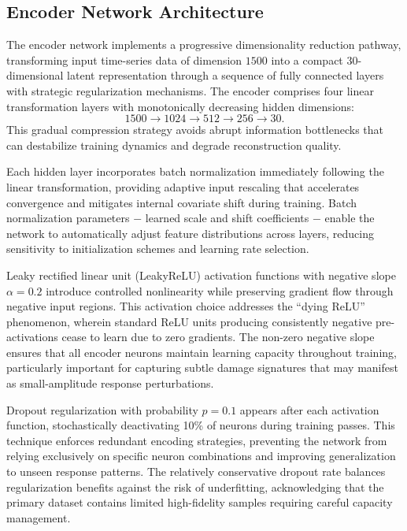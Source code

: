 \documentclass[12pt,a4paper]{report}
\begin{document}
\subsection{Encoder Network Architecture}
\label{subsec:encoder_architecture}

The encoder network implements a progressive dimensionality reduction pathway, transforming input time-series data of dimension $1500$ into a compact $30$-dimensional latent representation through a sequence of fully connected layers with strategic regularization mechanisms. The encoder comprises four linear transformation layers with monotonically decreasing hidden dimensions:
\[
1500 \rightarrow 1024 \rightarrow 512 \rightarrow 256 \rightarrow 30.
\]
This gradual compression strategy avoids abrupt information bottlenecks that can destabilize training dynamics and degrade reconstruction quality.

Each hidden layer incorporates batch normalization immediately following the linear transformation, providing adaptive input rescaling that accelerates convergence and mitigates internal covariate shift during training. Batch normalization parameters $-$ learned scale and shift coefficients $-$ enable the network to automatically adjust feature distributions across layers, reducing sensitivity to initialization schemes and learning rate selection.

Leaky rectified linear unit (LeakyReLU) activation functions with negative slope $\alpha = 0.2$ introduce controlled nonlinearity while preserving gradient flow through negative input regions. This activation choice addresses the ``dying ReLU'' phenomenon, wherein standard ReLU units producing consistently negative pre-activations cease to learn due to zero gradients. The non-zero negative slope ensures that all encoder neurons maintain learning capacity throughout training, particularly important for capturing subtle damage signatures that may manifest as small-amplitude response perturbations.

Dropout regularization with probability $p = 0.1$ appears after each activation function, stochastically deactivating 10\% of neurons during training passes. This technique enforces redundant encoding strategies, preventing the network from relying exclusively on specific neuron combinations and improving generalization to unseen response patterns. The relatively conservative dropout rate balances regularization benefits against the risk of underfitting, acknowledging that the primary dataset contains limited high-fidelity samples requiring careful capacity management.
\end{document}
